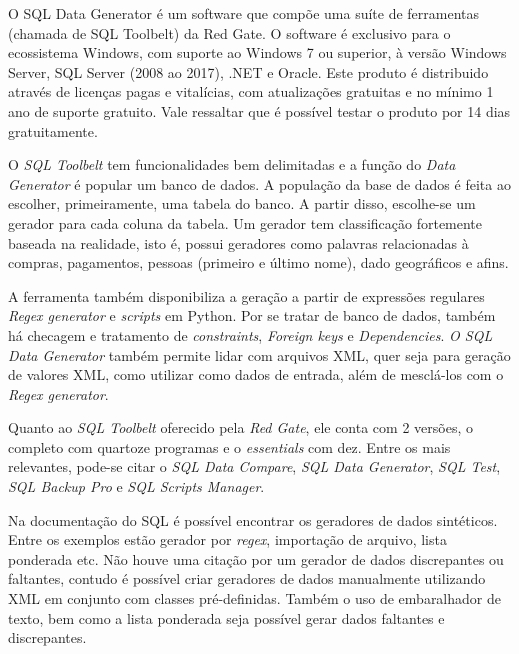 \documentclass[
	12pt,				%
	openright,			%
	oneside,			%
	a4paper,			%
	english,			%
	brazil				%
	]{abntex2}
\begin{document}
		O SQL Data Generator \cite{RedgateSQLDataGenerator} é um software que compõe uma suíte de ferramentas (chamada de SQL Toolbelt) da Red Gate.
		O software é exclusivo para o ecossistema Windows, com suporte ao Windows 7 ou superior, à versão Windows Server, SQL Server (2008 ao 2017), .NET e Oracle.
		Este produto é distribuido através de licenças pagas e vitalícias, com atualizações gratuitas e no mínimo 1 ano de suporte gratuito.
		Vale ressaltar que é possível testar o produto por 14 dias gratuitamente.
		\par
		O \emph{SQL Toolbelt} tem funcionalidades bem delimitadas e a função do \emph{Data Generator} é popular um banco de dados. 
		A população da base de dados é feita ao escolher, primeiramente, uma tabela do banco.
		A partir disso, escolhe-se um gerador para cada coluna da tabela.
		Um gerador tem classificação fortemente baseada na realidade, isto é, possui geradores como palavras relacionadas à compras, pagamentos, pessoas (primeiro e último nome), dado geográficos e afins.
		\par
		A ferramenta também disponibiliza a geração a partir de expressões regulares \emph{Regex generator} e \emph{scripts} em Python.
		Por se tratar de banco de dados, também há checagem e tratamento de \emph{constraints}, \emph{Foreign keys} e \emph{Dependencies}.
		\emph{O SQL Data Generator} também permite lidar com arquivos XML, quer seja para geração de valores XML, como utilizar como dados de entrada, além de mesclá-los com o \emph{Regex generator}.
		\par
		Quanto ao \emph{SQL Toolbelt} oferecido pela \emph{Red Gate}, ele conta com 2 versões, o completo com quartoze programas e o \emph{essentials} com dez.
		Entre os mais relevantes, pode-se citar o \emph{SQL Data Compare}, \emph{SQL Data Generator}, \emph{SQL Test}, \emph{SQL Backup Pro} e \emph{SQL Scripts Manager}.
		\par
		Na documentação do SQL \cite{RedgateSQLDataGeneratorDoc} é possível encontrar os geradores de dados sintéticos.
		Entre os exemplos estão gerador por \emph{regex}, importação de arquivo, lista ponderada etc.
		Não houve uma citação por um gerador de dados discrepantes ou faltantes,
		 contudo é possível criar geradores de dados manualmente utilizando XML em conjunto com classes pré-definidas.
		Também o uso de embaralhador de texto, bem como a lista ponderada seja possível gerar dados faltantes e discrepantes.
\end{document}
